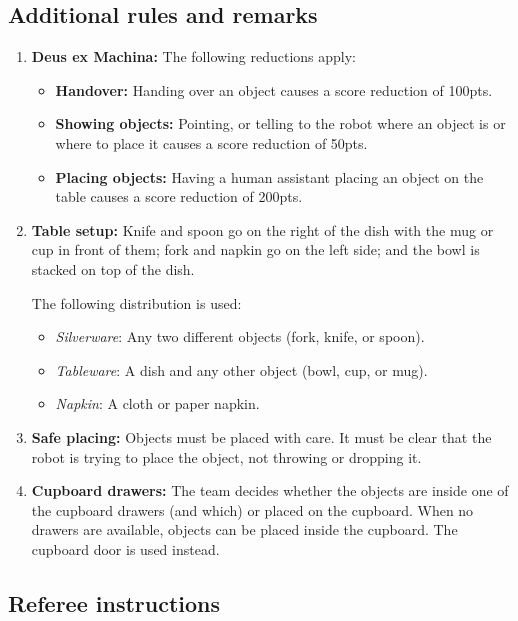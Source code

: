 \subsection*{Additional rules and remarks}
\begin{enumerate}[nosep]
	\item \textbf{Deus ex Machina:} The following reductions apply:
	\begin{itemize}[nosep]
		\item \textbf{Handover:} Handing over an object causes a score reduction of 100pts.
		\item \textbf{Showing objects:} Pointing, or telling to the robot where an object is or where to place it causes a score reduction of 50pts.
		\item \textbf{Placing objects:} Having a human assistant placing an object on the table causes a score reduction of 200pts.
	\end{itemize}

	\item \textbf{Table setup:} Knife and spoon go on the right of the dish with the mug or cup in front of them; fork and napkin go on the left side; and the bowl is stacked on top of the dish.

	The following distribution is used:
	\begin{itemize}[nosep]
		\item\textit{Silverware}: Any two different objects (fork, knife, or spoon).
		\item\textit{Tableware}: A dish and any other object (bowl, cup, or mug).
		\item\textit{Napkin}: A cloth or paper napkin.
	\end{itemize}


	\item \textbf{Safe placing:} Objects must be placed with care. It must be clear that the robot is trying to place the object, not throwing or dropping it.

	\item \textbf{Cupboard drawers:} The team decides whether the objects are inside one of the cupboard drawers (and which) or placed on the cupboard.
	When no drawers are available, objects can be placed inside the cupboard. The cupboard door is used instead.

\end{enumerate}

\subsection*{Referee instructions}

